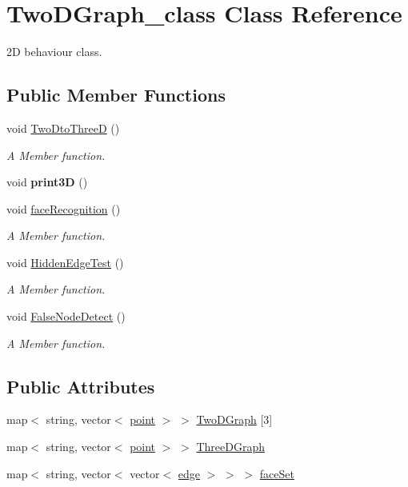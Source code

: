 \hypertarget{classTwoDGraph__class}{}\section{Two\+D\+Graph\+\_\+class Class Reference}
\label{classTwoDGraph__class}


2D behaviour class.  


\subsection*{Public Member Functions}
\begin{DoxyCompactItemize}
\item 
void \hyperlink{classTwoDGraph__class_a48222790dda1c34caf1366ce1cc0ce1d}{Two\+Dto\+ThreeD} ()
\begin{DoxyCompactList}\small\item\em A Member function. \end{DoxyCompactList}\item 
void {\bfseries print3D} ()\hypertarget{classTwoDGraph__class_a767c2d4861c0b78aa617e1403fcb65e1}{}\label{classTwoDGraph__class_a767c2d4861c0b78aa617e1403fcb65e1}

\item 
void \hyperlink{classTwoDGraph__class_af0b7cb652fec315e79e0f4826c64ae6d}{face\+Recognition} ()
\begin{DoxyCompactList}\small\item\em A Member function. \end{DoxyCompactList}\item 
void \hyperlink{classTwoDGraph__class_a551441ccdbceddd7c5d7df8c3a0a3e04}{Hidden\+Edge\+Test} ()
\begin{DoxyCompactList}\small\item\em A Member function. \end{DoxyCompactList}\item 
void \hyperlink{classTwoDGraph__class_aac6062b9859be331a44d1fe61036d5a1}{False\+Node\+Detect} ()
\begin{DoxyCompactList}\small\item\em A Member function. \end{DoxyCompactList}\end{DoxyCompactItemize}
\subsection*{Public Attributes}
\begin{DoxyCompactItemize}
\item 
map$<$ string, vector$<$ \hyperlink{structpoint}{point} $>$ $>$ \hyperlink{classTwoDGraph__class_aab69ccead28f685a9e084f52e1488354}{Two\+D\+Graph} \mbox{[}3\mbox{]}
\item 
map$<$ string, vector$<$ \hyperlink{structpoint}{point} $>$ $>$ \hyperlink{classTwoDGraph__class_a6b9cd70ed1be50fb248b56f6da30a3c5}{Three\+D\+Graph}
\item 
map$<$ string, vector$<$ vector$<$ \hyperlink{structedge}{edge} $>$ $>$ $>$ \hyperlink{classTwoDGraph__class_a80d22cc10e3cfa2d3f090bc0b506e2ea}{face\+Set}
\end{DoxyCompactItemize}


